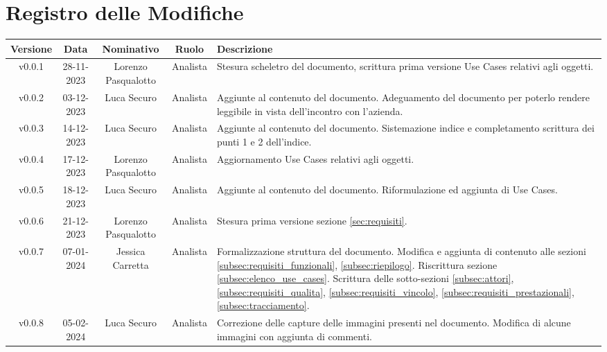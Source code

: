 \section*{\Large Registro delle Modifiche}
    \begin{table}[h]
        \centering
        \renewcommand\tabularxcolumn[1]{m{#1}} %
        \renewcommand{\arraystretch}{1.5}
        \begin{tabularx}{0.98\textwidth}
            {c|c|c|c|>{\centering\arraybackslash}X}
            \rowcolor{black}
            \textbf{\color{white} Versione} & \textbf{\color{white} Data} & \textbf{\color{white} Nominativo} & \textbf{\color{white} Ruolo} & \textbf{\color{white} Descrizione} \\ 
            \hline

            v0.0.1 & 28-11-2023 & Lorenzo Pasqualotto & Analista & Stesura scheletro del documento, scrittura prima versione Use Cases relativi agli oggetti. \\
            v0.0.2 & 03-12-2023 & Luca Securo & Analista & Aggiunte al contenuto del documento. Adeguamento del documento per poterlo rendere leggibile in vista dell'incontro con l'azienda. \\
            v0.0.3 & 14-12-2023 & Luca Securo & Analista & Aggiunte al contenuto del documento. Sistemazione indice e completamento scrittura dei punti 1 e 2 dell'indice.\\
            v0.0.4 & 17-12-2023 & Lorenzo Pasqualotto & Analista &  Aggiornamento Use Cases relativi agli oggetti.\\
            v0.0.5 & 18-12-2023 & Luca Securo & Analista & Aggiunte al contenuto del documento. Riformulazione ed aggiunta di Use Cases.\\
            v0.0.6 & 21-12-2023 & Lorenzo Pasqualotto & Analista & Stesura prima versione sezione \ref{sec:requisiti}.\\
            v0.0.7 & 07-01-2024 & Jessica Carretta & Analista & Formalizzazione struttura del documento. Modifica e aggiunta di contenuto alle sezioni \ref{subsec:requisiti_funzionali}, \ref{subsec:riepilogo}. Riscrittura sezione \ref{subsec:elenco_use_cases}. Scrittura delle sotto-sezioni \ref{subsec:attori}, \ref{subsec:requisiti_qualita}, \ref{subsec:requisiti_vincolo}, \ref{subsec:requisiti_prestazionali},\ref{subsec:tracciamento}.\\
            v0.0.8 & 05-02-2024 & Luca Securo & Analista & Correzione delle capture delle immagini presenti nel documento. Modifica di alcune immagini con aggiunta di commenti.\\
            \hline
        \end{tabularx}
    \end{table}